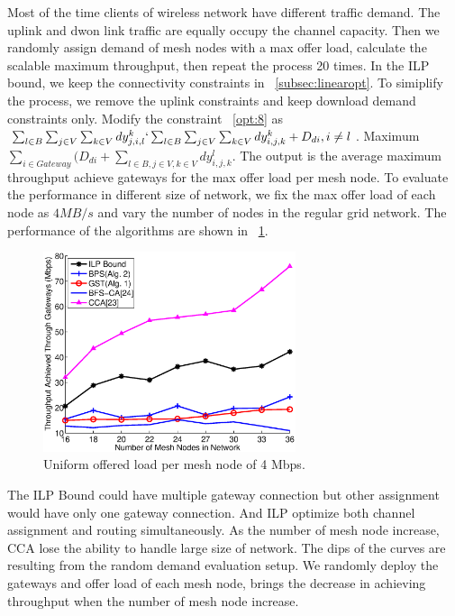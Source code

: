 Most of the time clients of wireless network have different traffic demand. The uplink and dwon link traffic are equally occupy the channel capacity.
   Then we randomly assign demand of mesh nodes with a max offer load,
   calculate the scalable maximum throughput, then repeat the process 20 times.
   In the ILP bound, we keep the connectivity constraints in ~\ref{subsec:linearopt}. To simiplify the process, we remove the uplink constraints and keep download demand constraints only. 
   Modify the constraint ~\ref{opt:8} as 
   $\sum_{l \in B} \sum_{j \in V} \sum_{k \in V} dy^k_{j,i,l} \lq \sum_{l \in B} \sum_{j \in V} \sum_{k \in V} dy^k_{i,j,k}+D_{di}, i \neq l$. 
   Maximum $\sum_{i\in Gateway} (D_{di}+\sum_{l\in B,j\in V, k \in V}dy^l_{i,j,k}$.
The output is the average maximum throughput achieve gateways for the max offer load per mesh node.
To evaluate the performance in different size of network, we fix the max offer load of each node as $4MB/s$ and vary the number of nodes in the regular grid network. The performance of the algorithms are shown in ~\ref{fig:varysize}. 
   \begin{figure}
   \centering
   \includegraphics[width=74mm]{figures/varysize}
   \vspace{-0.1in}
   \caption{Uniform offered load per mesh node of 4 Mbps.}                                                                 
   \label{fig:varysize}
   \end{figure}

The ILP Bound could have multiple gateway connection but other assignment would have only one gateway connection. And ILP optimize both channel assignment and routing simultaneously.  
As the number of mesh node increase, CCA lose the ability to handle large size of network. 
The dips of the curves are resulting from the random demand evaluation setup.
We randomly deploy the gateways and offer load of each mesh node, brings the decrease in achieving throughput when the number of mesh node increase. 


